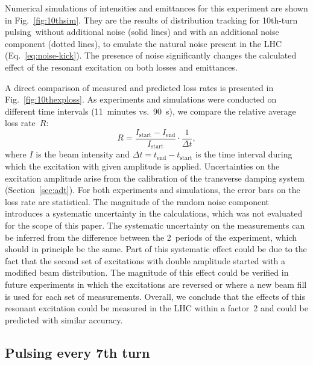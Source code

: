 \documentclass[
prstab
,reprint
,linenumbers
,longbibliography
,preprintnumbers
,showkeys
,amsfonts,amssymb,amsmath
,floatfix
]{revtex4-1}
\newcommand{\tenthtp}{10th-turn pulsing}
\begin{document}
Numerical simulations of intensities and emittances for this
experiment are shown in Fig.~\ref{fig:10thsim}. They are the results
of distribution tracking for \tenthtp\ without
additional noise (solid lines) and with an additional noise component
(dotted lines), to emulate the natural noise present in the LHC
(Eq.~\ref{eq:noise-kick}). The presence of noise significantly changes
the calculated effect of the resonant excitation on both losses and
emittances.

A direct comparison of measured and predicted loss rates is presented
in Fig.~\ref{fig:10thexploss}. As experiments and simulations were
conducted on different time intervals (11~minutes vs.\ 90~s), we
compare the relative average loss rate~$R$:
%
\begin{equation}
  \label{eqn:lossrate}
  R = \frac{I_{\mathrm{start}} - I_{\mathrm{end}}}{I_{\mathrm{start}}}
  \cdot \frac{1}{\Delta t},
\end{equation}
%
where $I$ is the beam intensity and
$\Delta t = t_\mathrm{end} - t_\mathrm{start}$ is the time interval
during which the excitation with given amplitude is
applied. Uncertainties on the excitation amplitude arise from the
calibration of the transverse damping system
(Section~\ref{sec:adt}). For both experiments and simulations, the
error bars on the loss rate are statistical. The magnitude of the
random noise component introduces a systematic uncertainty in the
calculations, which was not evaluated for the scope of this paper. The
systematic uncertainty on the measurements can be inferred from the
difference between the 2~periods of the experiment, which should in
principle be the same. Part of this systematic effect could be due to
the fact that the second set of excitations with double amplitude
started with a modified beam distribution. The magnitude of this
effect could be verified in future experiments in which the
excitations are reversed or where a new beam fill is used for each set
of measurements. Overall, we conclude that the effects of this
resonant excitation could be measured in the LHC within a factor~2 and
could be predicted with similar accuracy.



\subsection{Pulsing every 7th turn}
\label{sec:simex7}
\end{document}
